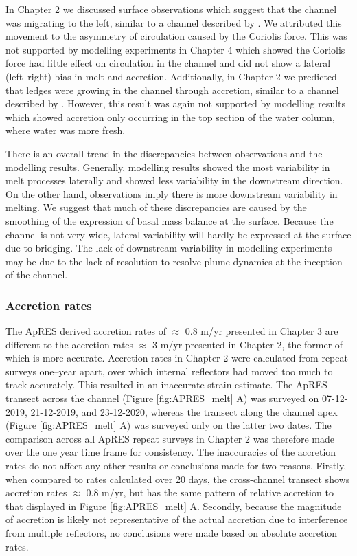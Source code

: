 In Chapter 2 we discussed surface observations which suggest that the channel was migrating to the left, similar to a channel described by \cite{chartrand2020basal}. We attributed this movement to the asymmetry of circulation caused by the Coriolis force. This was not supported by modelling experiments in Chapter 4 which showed the Coriolis force had little effect on circulation in the channel and did not show a lateral (left--right) bias in melt and accretion. Additionally, in Chapter 2 we predicted that ledges were growing in the channel through accretion, similar to a channel described by \cite{dutrieux2014basal}. However, this result was again not supported by modelling results which showed accretion only occurring in the top section of the water column, where water was more fresh.

There is an overall trend in the discrepancies between observations and the modelling results. Generally, modelling results showed the most variability in melt processes laterally and showed less variability in the downstream direction. On the other hand, observations imply there is more downstream variability in melting.
We suggest that much of these discrepancies are caused by the smoothing of the expression of basal mass balance at the surface. Because the channel is not very wide, lateral variability will hardly be expressed at the surface due to bridging. The lack of downstream variability in modelling experiments may be due to the lack of resolution to resolve plume dynamics at the inception of the channel.

\subsubsection{Accretion rates}

The ApRES derived accretion rates of $\approx$ 0.8 m/yr presented in Chapter 3 are different to the accretion rates $\approx$ 3 m/yr presented in Chapter 2, the former of which is more accurate. Accretion rates in Chapter 2 were calculated from repeat surveys one--year apart, over which internal reflectors had moved too much to track accurately. This resulted in an inaccurate strain estimate. The ApRES transect across the channel (Figure \ref{fig:APRES_melt} A) was surveyed on 07-12-2019, 21-12-2019, and 23-12-2020, whereas the transect along the channel apex (Figure \ref{fig:APRES_melt} A) was surveyed only on the latter two dates. The comparison across all ApRES repeat surveys in Chapter 2 was therefore made over the one year time frame for consistency.  The inaccuracies of the accretion rates do not affect any other results or conclusions made for two reasons. Firstly, when compared to rates calculated over 20 days, the cross-channel transect shows accretion rates $\approx$ 0.8 m/yr, but has the same pattern of relative accretion to that displayed in Figure \ref{fig:APRES_melt} A.  Secondly, because the magnitude of accretion is likely not representative of the actual accretion due to interference from multiple reflectors, no conclusions were made based on absolute accretion rates.

